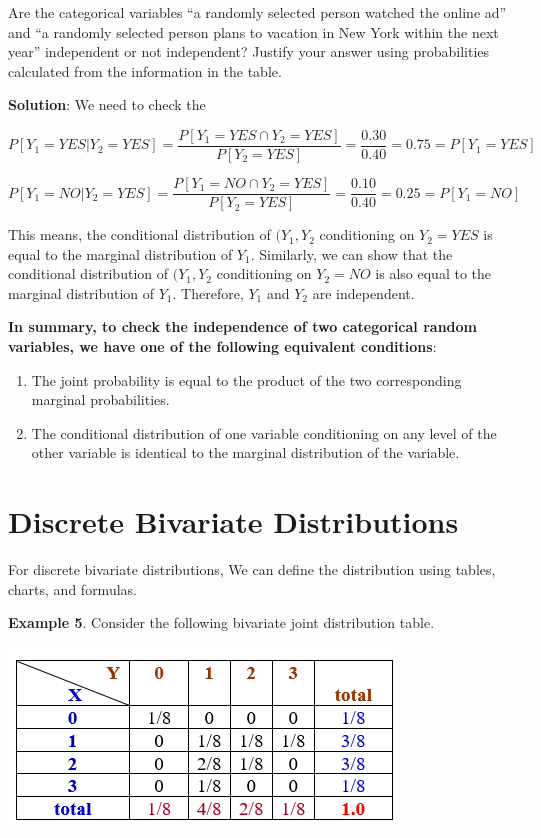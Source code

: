 \documentclass[
]{book}
\begin{document}
Are the categorical variables ``a randomly selected person watched the online ad'' and ``a randomly selected person plans to vacation in New York within the next year'' independent or not independent? Justify your answer using probabilities calculated from the information in the table.

\textbf{Solution}: We need to check the

\[
P[Y_1 =YES|Y_2 = YES] = \frac{P[Y_1=YES\cap Y_2=YES]}{P[Y_2=YES]} = \frac{0.30}{0.40} = 0.75 =P[Y_1=YES]
\]

\[
P[Y_1 =NO|Y_2 = YES] = \frac{P[Y_1=NO\cap Y_2=YES]}{P[Y_2=YES]} = \frac{0.10}{0.40} = 0.25 =P[Y_1=NO]
\]

This means, the conditional distribution of \((Y_1, Y_2\) conditioning on \(Y_2 = YES\) is equal to the marginal distribution of \(Y_1\). Similarly, we can show that the conditional distribution of \((Y_1, Y_2\) conditioning on \(Y_2 = NO\) is also equal to the marginal distribution of \(Y_1\). Therefore, \(Y_1\) and \(Y_2\) are independent.

\hfill\break

\textbf{In summary, to check the independence of two categorical random variables, we have one of the following equivalent conditions}:

\begin{enumerate}
\def\labelenumi{\arabic{enumi}.}
\item
  The joint probability is equal to the product of the two corresponding marginal probabilities.
\item
  The conditional distribution of one variable conditioning on any level of the other variable is identical to the marginal distribution of the variable.
\end{enumerate}

\hfill\break

\hypertarget{discrete-bivariate-distributions-1}{%
\section{Discrete Bivariate Distributions}\label{discrete-bivariate-distributions-1}}

For discrete bivariate distributions, We can define the distribution using tables, charts, and formulas.

\textbf{Example 5}. Consider the following bivariate joint distribution table.

\begin{center}\includegraphics[width=0.45\linewidth]{topic07/example05DiscreteDist} \end{center}
\end{document}
